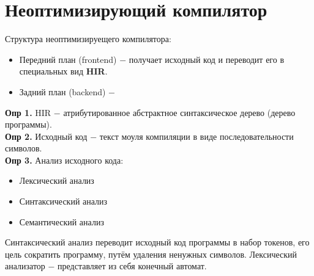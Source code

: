\documentclass[a4paper, 12pt, titlepage, finall]{extreport}
\begin{document}
    \chapter{Неоптимизирующий компилятор}
        Структура неоптимизируещего компилятора:
        \begin{itemize}
            \item Передний план (frontend) $-$ получает исходный код и переводит его в специальных вид \textbf{HIR}.
            \item Задний план (backend) $-$
        \end{itemize}
        \textbf{Опр 1.} HIR $-$ атрибутированное абстрактное синтаксическое дерево (дерево программы).\\
        \textbf{Опр 2.} Исходный код $-$ текст моуля компиляции в виде последовательности символов.\\
        \textbf{Опр 3.}
        Анализ исходного кода:
        \begin{itemize}
            \item Лексический анализ
            \item Синтаксический анализ
            \item Семантический анализ
        \end{itemize}
        Синтаксический анализ переводит исходный код программы в набор токенов, его цель сократить программу, путём удаления ненужных символов.
        Лексический анализатор $-$ представляет из себя конечный автомат.
\end{document}
